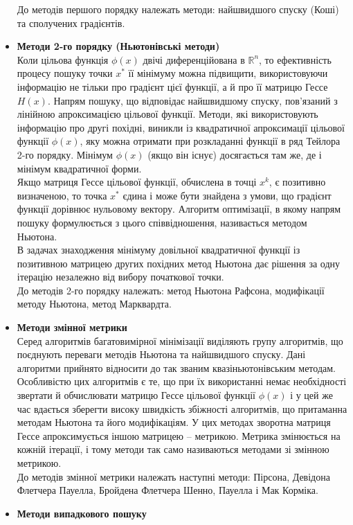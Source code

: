 \begin{itemize}
	До методів першого порядку належать методи: найшвидшого спуску (Коші) та сполучених градієнтів.
	\item \textbf{Методи 2-го порядку (Ньютонівські методи)}\\
	Коли цільова функція $\phi(x)$ двічі диференційована в $\mathbb{R}^n$, то ефективність процесу пошуку точки $x^*$ її мінімуму можна підвищити, використовуючи інформацію не тільки  про градієнт цієї функції, а й про її матрицю Гессе $H(x)$. Напрям пошуку, що відповідає найшвидшому спуску, пов'язаний з лінійною апроксимацією цільової функції. Методи, які використовують інформацію про другі похідні, виникли із квадратичної апроксимації цільової функції $\phi(x)$, яку можна отримати при розкладанні функції в ряд Тейлора 2-го порядку. Мінімум $\phi(x)$ (якщо він існує)  досягається там же, де і мінімум квадратичної форми. \\ 
	Якщо матриця Гессе цільової функції, обчислена в точці $x^k$, є позитивно визначеною, то точка $x^*$ єдина і може бути знайдена з умови, що градієнт функції дорівнює нульовому вектору. Алгоритм оптимізації, в якому напрям пошуку формулюється з цього співвідношення, називається методом Ньютона. \\
	В задачах знаходження мінімуму довільної квадратичної функції із позитивною матрицею других похідних метод Ньютона дає рішення за одну ітерацію незалежно від вибору початкової точки. \\
	До методів 2-го порядку належать: метод Ньютона Рафсона, модифікації методу Ньютона, метод Марквардта.
	\item \textbf{Методи змінної метрики}\\
	Серед алгоритмів багатовимірної мінімізації виділяють групу алгоритмів, що поєднують переваги методів Ньютона та найшвидшого спуску. Дані алгоритми прийнято відносити до так званим квазіньютонівським методам. Особливістю цих алгоритмів є те, що при їх використанні немає необхідності звертати й обчислювати матрицю Гессе цільової функції $\phi(x)$ і у цей же час вдається зберегти високу швидкість збіжності алгоритмів, що притаманна методам Ньютона та його модифікаціям. У цих методах зворотна матриця Гессе апроксимується іншою матрицею – метрикою. Метрика змінюється на кожній ітерації, і тому методи так само називаються методами зі змінною метрикою. \\
	До методів змінної метрики належать наступні методи: Пірсона, Девідона Флетчера Пауелла, Бройдена Флетчера Шенно, Пауелла і Мак Корміка.
	\item \textbf{Методи випадкового пошуку} \\

\end{itemize}
